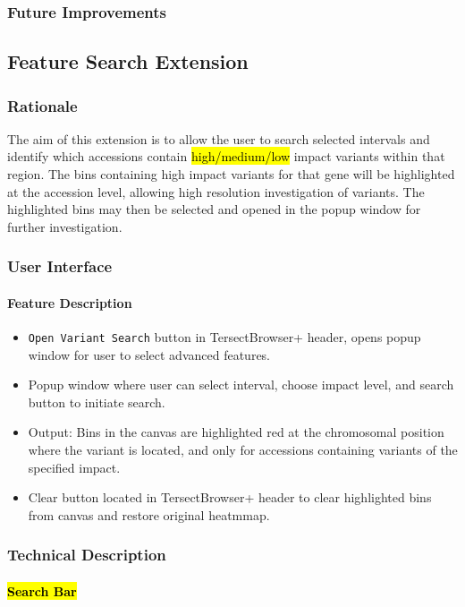 \documentclass[12pt]{article}
\begin{document}
\begin{itemize}
\subsubsection{Future Improvements}

\subsection{Feature Search Extension}
\subsubsection{Rationale}
The aim of this extension is to allow the user to search selected intervals and identify which accessions contain \hl{high/medium/low} impact variants within that region. The bins containing high impact variants for that gene will be highlighted at the accession level, allowing high resolution investigation of variants. The highlighted bins may then be selected and opened in the popup  window for further investigation.

\subsubsection{User Interface}
\paragraph{Feature Description}
\begin{itemize}
    \item \verb+Open Variant Search+ button in TersectBrowser+ header, opens popup window for user to select advanced features.
    \item Popup window where user can select interval, choose impact level, and search button to initiate search.
    \item Output: Bins in the canvas are highlighted red at the chromosomal position where the variant is located, and only for accessions containing variants of the specified impact.
    \item Clear button located in TersectBrowser+ header to clear highlighted bins from canvas and restore original heatmmap.
\end{itemize}
\subsubsection{Technical Description}
\paragraph{\hl{Search Bar}}

\end{itemize}
\end{document}

